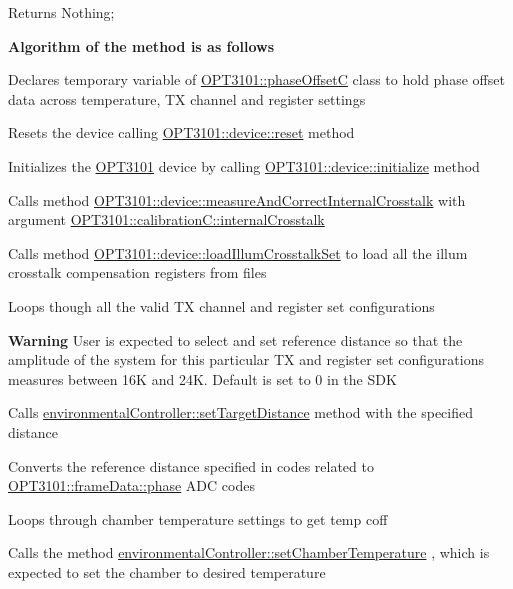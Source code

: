 \begin{DoxyReturn}{Returns}
Nothing; 
\end{DoxyReturn}
{\bfseries Algorithm of the method is as follows}


\begin{DoxyItemize}
\item Declares temporary variable of \mbox{\hyperlink{class_o_p_t3101_1_1phase_offset_c}{O\+P\+T3101\+::phase\+OffsetC}} class to hold phase offset data across temperature, TX channel and register settings
\item Resets the device calling \mbox{\hyperlink{class_o_p_t3101_1_1device_a1d37b22f535d8130c7f24799f7fa3c33}{O\+P\+T3101\+::device\+::reset}} method
\item Initializes the \mbox{\hyperlink{namespace_o_p_t3101}{O\+P\+T3101}} device by calling \mbox{\hyperlink{class_o_p_t3101_1_1device_ae3b7fb4f9a8f1dee330523e034aa9460}{O\+P\+T3101\+::device\+::initialize}} method
\item Calls method \mbox{\hyperlink{class_o_p_t3101_1_1device_a44f832d6edbfb26db079ddba4debfdba}{O\+P\+T3101\+::device\+::measure\+And\+Correct\+Internal\+Crosstalk}} with argument \mbox{\hyperlink{class_o_p_t3101_1_1calibration_c_a4df5b876541e9b33eadf6290fe08b7e5}{O\+P\+T3101\+::calibration\+C\+::internal\+Crosstalk}}
\item Calls method \mbox{\hyperlink{class_o_p_t3101_1_1device_a48b320dfe4376bf62043d10ba937e8cd}{O\+P\+T3101\+::device\+::load\+Illum\+Crosstalk\+Set}} to load all the illum crosstalk compensation registers from files
\item Loops though all the valid TX channel and register set configurations
\item {\bfseries Warning} User is expected to select and set reference distance so that the amplitude of the system for this particular TX and register set configurations measures between 16K and 24K. Default is set to 0 in the S\+DK
\item Calls \mbox{\hyperlink{classenvironmental_controller_a8251b7f25c6a6c5583c718bac664d05b}{environmental\+Controller\+::set\+Target\+Distance}} method with the specified distance
\item Converts the reference distance specified in codes related to \mbox{\hyperlink{class_o_p_t3101_1_1frame_data_af8661d11405953dc378ad4d7cb0f2db6}{O\+P\+T3101\+::frame\+Data\+::phase}} A\+DC codes
\item Loops through chamber temperature settings to get temp coff
\item Calls the method \mbox{\hyperlink{classenvironmental_controller_a3c23e944f34f2d7c0fa0b279d5fc8a3f}{environmental\+Controller\+::set\+Chamber\+Temperature}} , which is expected to set the chamber to desired temperature

\end{DoxyItemize}
